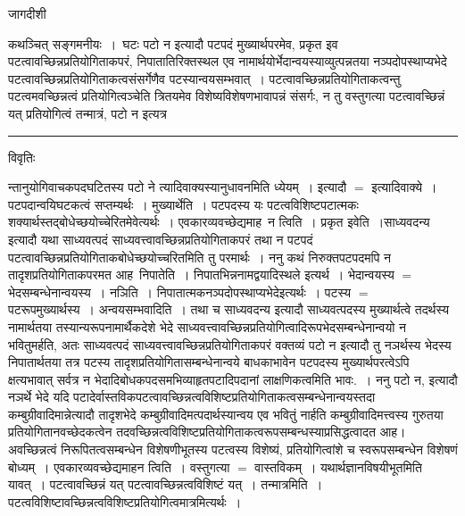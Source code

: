\documentclass[10pt, openany]{book}
\begin{document}
{\newpage
\begin{center} जागदीशी \end{center}
{\la कथञ्चित् सङ्गमनीयः~।~{\qt घटः पटो न} इत्यादौ पटपदं मुख्यार्थपरमेव, प्रकृत इव पटत्वावच्छिन्नप्रतियोगिताकपरं, निपातातिरिक्तस्थल एव नामार्थयोर्भेदान्वयस्याव्युत्पन्नतया नञ्पदोपस्थाप्यभेदे पटत्वावच्छिन्नप्रतियोगिताकत्वसंसर्गेणैव पटस्यान्वयसम्भवात्~। पटत्वावच्छिन्नप्रतियोगिताकत्वन्तु पटत्वमवच्छिन्नत्वं प्रतियोगित्वञ्चेति त्रितयमेव विशेष्यविशेषणभावापन्नं संसर्गः, न तु वस्तुगत्या पटत्वावच्छिन्नं यत् प्रतियोगित्वं तन्मात्रं, पटो न इत्यत्र}\\
\hrule
\begin{center}     विवृतिः \end{center}
न्तानुयोगिवाचकपदघटितस्य {\qt पटो ने} त्यादिवाक्यस्यानुधावनमिति ध्येयम्~। इत्यादौ $=$ इत्यादिवाक्ये~। पटपदान्वयि\textendash घटकत्वं सप्तम्यर्थः~। मुख्यार्थेति~। पटपदस्य यः पटत्वविशिष्टपटात्मकः शक्यार्थस्तद्बोधेच्छयोच्चेरितमेवेत्यर्थः~। एवकारव्यवच्छेद्यमाह\textemdash\ न त्विति~। प्रकृत इवेति~।{\qt साध्यवदन्य} इत्यादौ यथा साध्यवत्पदं साध्यवत्त्वावच्छिन्नप्रतियोगिताकपरं तथा न पटपदं पटत्वावच्छिन्नप्रतियोगिताकबोधेच्छयोच्चरितमिति तु परमार्थः~। ननु कथं निरुक्तपटपदमपि न तादृशप्रतियोगिताकपरमत आह\textendash\ निपातेति~।  निपातभिन्ननामद्वयादिस्थले इत्यर्थ~। भेदान्वयस्य $=$ भेदसम्बन्धेनान्वयस्य~। नञिति~। निपातात्मकनञ्पदोपस्थाप्यभेदेइत्यर्थः~। पटस्य $=$ पटरूपमुख्यार्थस्य~। अन्वयसम्भवादिति~। तथा च {\qt साध्यवदन्य} इत्यादौ साध्यवत्पदस्य मुख्यार्थत्वे तदर्थस्य नामार्थतया तस्यान्यरूपनामार्थैकदेशे भेदे साध्यवत्त्वावच्छिन्नप्रतियोगित्वादिरूपभेदसम्बन्धेनान्वयो न भवितुमर्हति, अतः साध्यवत्पदं साध्यवत्त्वावच्छिन्नप्रतियोगिताकपरं
वक्तव्यं {\qt पटो न} इत्यादौ तु नञर्थस्य भेदस्य निपातार्थतया तत्र पटस्य तादृशप्रतियोगितासम्बन्धेनान्वये बाधकाभावेन पटपदस्य मुख्यार्थपरत्वेऽपि क्षत्यभावात्
सर्वत्र न भेदादिबोधकपदसमभिव्याहृतपटादिपदानां लाक्षणिकत्वमिति भावः.~। ननु पटो न, इत्यादौ नञर्थे भेदे यदि पटादेर्वास्तविकपटत्वावच्छिन्नत्वविशिष्टप्रतियोगिताकत्वसम्बन्धेनान्वयस्तदा कम्बुग्रीवादिमान्नेत्यादौ तादृशभेदे कम्बुग्रीवादिमत्पदार्थस्यान्वय एव भवितुं नार्हति कम्बुग्रीवादिमत्त्वस्य गुरुतया प्रतियोगितानवच्छेदकत्वेन तदवच्छिन्नत्वविशिष्टप्रतियोगिताकत्वरूपसम्बन्धस्याप्रसिद्धत्वादत आह। अवच्छिन्नत्वं निरूपितत्वसम्बन्धेन विशेषणीभूतस्य पटत्वस्य विशेष्यं, प्रतियोगित्वांशे च स्वरूपसम्बन्धेन विशेषणं बोध्यम्~। एवकारव्यवच्छेद्यमाह\textendash न त्विति~। वस्तुगत्या $=$ वास्तविकम्~। यथार्थज्ञानविषयीभूतमिति यावत्~। पटत्वावच्छिन्नं यत्  पटत्वावच्छिन्नत्वविशिष्टं यत्~। {\qt तन्मात्रमिति}~।पटत्वविशिष्टावच्छिन्नत्वविशिष्टप्रतियोगित्वमात्रमित्यर्थः~।
}
\end{document}
